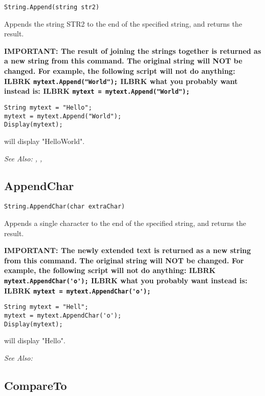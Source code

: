 \begin{verbatim}
String.Append(string str2)
\end{verbatim}
Appends the string STR2 to the end of the specified string, and returns the result.

\bf{IMPORTANT:} The result of joining the strings together is returned as a new
string from this command. The original string will \bf{NOT} be changed. For
example, the following script will not do anything: ILBRK
\verb$mytext.Append("World");$ ILBRK
what you probably want instead is: ILBRK
\verb$mytext = mytext.Append("World");$

\begin{verbatim}
String mytext = "Hello";
mytext = mytext.Append("World");
Display(mytext);
\end{verbatim}
will display "HelloWorld".

\it{See Also:} ,
, 


\subsection{AppendChar}\label{String.AppendChar}%

\begin{verbatim}
String.AppendChar(char extraChar)
\end{verbatim}
Appends a single character to the end of the specified string, and returns the result.

\bf{IMPORTANT:} The newly extended text is returned as a new string from this command.
The original string will \bf{NOT} be changed. For
example, the following script will not do anything: ILBRK
\verb$mytext.AppendChar('o');$ ILBRK
what you probably want instead is: ILBRK
\verb$mytext = mytext.AppendChar('o');$

\begin{verbatim}
String mytext = "Hell";
mytext = mytext.AppendChar('o');
Display(mytext);
\end{verbatim}
will display "Hello".

\it{See Also:} 


\subsection{CompareTo}\label{String.CompareTo}%

